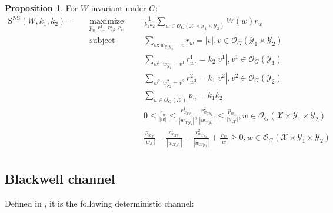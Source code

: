 \documentclass[11pt]{article}
\theoremstyle{definition}
\newtheorem{prop}[theo]{Proposition}
\theoremstyle{remark}
\DeclareMathOperator{\maxi}{\text{maximize}}
\DeclareMathOperator{\st}{\text{subject to}}
\begin{document}
\begin{prop} For $W$ invariant under $G$:
  \begin{equation}
  \begin{aligned}
    \mathrm{S}^{\mathrm{NS}}(W,k_1,k_2) = &&\underset{p_u,r^1_{w^1},r^2_{w^2},r_w}{\maxi} &&& \frac{1}{k_1k_2}\sum_{w \in \mathcal{O}_G(\mathcal{X} \times \mathcal{Y}_1 \times \mathcal{Y}_2)} W(w)r_w\\
    &&\st &&& \sum_{w:w_{\mathcal{Y}_1\mathcal{Y}_2}=v} r_{w} = |v|, v \in \mathcal{O}_G(\mathcal{Y}_1 \times \mathcal{Y}_2)\\
    &&&&& \sum_{w^1:w^1_{\mathcal{Y}_1}=v^1} r^1_{w^1} = k_2|v^1|, v^1 \in \mathcal{O}_G(\mathcal{Y}_1)\\
    &&&&& \sum_{w^2:w^2_{\mathcal{Y}_2}=v^2} r^2_{w^2} = k_1|v^2|, v^2 \in \mathcal{O}_G(\mathcal{Y}_2)\\
    &&&&& \sum_{u \in \mathcal{O}_G(\mathcal{X})} p_u = k_1k_2\\
    &&&&& 0 \leq \frac{r_{w}}{|w|} \leq \frac{r^1_{w_{\mathcal{X}\mathcal{Y}_1}}}{|w_{\mathcal{X}\mathcal{Y}_1}|},\frac{r^2_{w_{\mathcal{X}\mathcal{Y}_2}}}{|w_{\mathcal{X}\mathcal{Y}_2}|} \leq \frac{p_{w_{\mathcal{X}}}}{|w_{\mathcal{X}}|}, w \in \mathcal{O}_G(\mathcal{X} \times \mathcal{Y}_1 \times \mathcal{Y}_2)\\
    &&&&& \frac{p_{w_{\mathcal{X}}}}{|w_{\mathcal{X}}|} - \frac{r^1_{w_{\mathcal{X}\mathcal{Y}_1}}}{|w_{\mathcal{X}\mathcal{Y}_1}|} - \frac{r^2_{w_{\mathcal{X}\mathcal{Y}_2}}}{|w_{\mathcal{X}\mathcal{Y}_2}|} +  \frac{r_{w}}{|w|} \geq 0, w \in \mathcal{O}_G(\mathcal{X} \times \mathcal{Y}_1 \times \mathcal{Y}_2)\\
  \end{aligned}
\end{equation}
\end{prop}

\subsection{Blackwell channel}
Defined in \cite{Meulen75}, it is the following deterministic channel:
\end{document}
